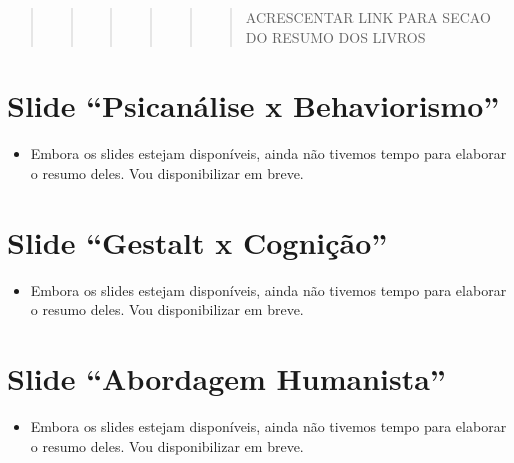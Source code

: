 \documentclass[
]{book}
\providecommand{\tightlist}{%
  \setlength{\itemsep}{0pt}\setlength{\parskip}{0pt}}
\begin{document}
\begin{quote}
\begin{quote}
\begin{quote}
\begin{quote}
\begin{quote}
\begin{quote}
ACRESCENTAR LINK PARA SECAO DO RESUMO DOS LIVROS
\end{quote}
\end{quote}
\end{quote}
\end{quote}
\end{quote}
\end{quote}

\hypertarget{slide-psicanuxe1lise-x-behaviorismo}{%
\section{Slide ``Psicanálise x Behaviorismo''}\label{slide-psicanuxe1lise-x-behaviorismo}}

\begin{itemize}
\tightlist
\item
  Embora os slides estejam disponíveis, ainda não tivemos tempo para elaborar o resumo deles. Vou disponibilizar em breve.
\end{itemize}

\hypertarget{slide-gestalt-x-cogniuxe7uxe3o}{%
\section{Slide ``Gestalt x Cognição''}\label{slide-gestalt-x-cogniuxe7uxe3o}}

\begin{itemize}
\tightlist
\item
  Embora os slides estejam disponíveis, ainda não tivemos tempo para elaborar o resumo deles. Vou disponibilizar em breve.
\end{itemize}

\hypertarget{slide-abordagem-humanista}{%
\section{Slide ``Abordagem Humanista''}\label{slide-abordagem-humanista}}

\begin{itemize}
\tightlist
\item
  Embora os slides estejam disponíveis, ainda não tivemos tempo para elaborar o resumo deles. Vou disponibilizar em breve.
\end{itemize}
\end{document}

